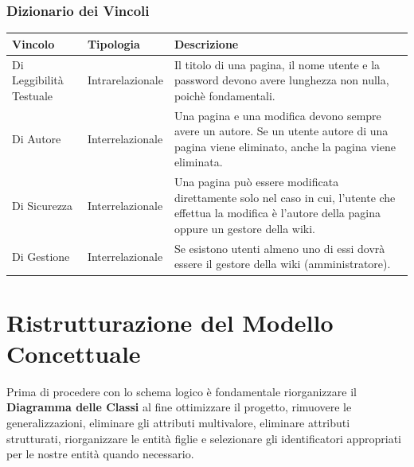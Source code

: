 \documentclass{article}
\begin{document}
	{\subsubsection {Dizionario dei Vincoli}}
	\begin{table}[H]
		\centering
		\small %
		\setlength{\tabcolsep}{6pt} %
		\renewcommand{\arraystretch}{1.2} %
		
		
		\begin{tabularx}{\textwidth}{|l|l|X|}
			\hline
			\textbf{Vincolo} &\textbf{Tipologia}  & \textbf{Descrizione} \\
			\hline
			Di Leggibilità Testuale & Intrarelazionale & Il titolo di una pagina, il nome utente e la password  devono avere lunghezza non nulla, poichè fondamentali.
			\\
			\hline
			Di Autore & Interrelazionale & Una pagina e una modifica devono sempre avere un autore. Se un utente autore di una pagina viene eliminato, anche la pagina viene eliminata.
			\\
			\hline	
			Di Sicurezza & Interrelazionale  & Una pagina può essere modificata direttamente solo nel caso in cui, l'utente che effettua la modifica è l'autore della pagina oppure un gestore della wiki.
			\\
			\hline	
			Di Gestione & Interrelazionale  & Se esistono utenti almeno uno di essi dovr\`a essere il gestore della wiki (amministratore).
			\\
			\hline
			
		\end{tabularx}
		
	\end{table}
	
	\newpage

	\section{Ristrutturazione del Modello Concettuale}
	Prima di procedere con lo schema logico è fondamentale riorganizzare il \textbf{Diagramma delle Classi} al fine ottimizzare il progetto, rimuovere le generalizzazioni, eliminare gli attributi multivalore, eliminare attributi strutturati, riorganizzare le entità figlie e selezionare gli identificatori appropriati per le nostre entità quando necessario. 
	\\\\
\end{document}
